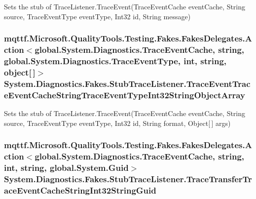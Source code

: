 Sets the stub of Trace\-Listener.\-Trace\-Event(\-Trace\-Event\-Cache event\-Cache, String source, Trace\-Event\-Type event\-Type, Int32 id, String message)

\hypertarget{class_system_1_1_diagnostics_1_1_fakes_1_1_stub_trace_listener_a326c8e6d891c2d7f46301b4ae4d710f0}{
\subsubsection[{Trace\-Event\-Trace\-Event\-Cache\-String\-Trace\-Event\-Type\-Int32\-String\-Object\-Array}]{\setlength{\rightskip}{0pt plus 5cm}mqttf.\-Microsoft.\-Quality\-Tools.\-Testing.\-Fakes.\-Fakes\-Delegates.\-Action$<$global.\-System.\-Diagnostics.\-Trace\-Event\-Cache, string, global.\-System.\-Diagnostics.\-Trace\-Event\-Type, int, string, object\mbox{[}$\,$\mbox{]}$>$ System.\-Diagnostics.\-Fakes.\-Stub\-Trace\-Listener.\-Trace\-Event\-Trace\-Event\-Cache\-String\-Trace\-Event\-Type\-Int32\-String\-Object\-Array}}\label{class_system_1_1_diagnostics_1_1_fakes_1_1_stub_trace_listener_a326c8e6d891c2d7f46301b4ae4d710f0}


Sets the stub of Trace\-Listener.\-Trace\-Event(\-Trace\-Event\-Cache event\-Cache, String source, Trace\-Event\-Type event\-Type, Int32 id, String format, Object\mbox{[}$\,$\mbox{]} args)

\hypertarget{class_system_1_1_diagnostics_1_1_fakes_1_1_stub_trace_listener_a0b27af26453f9da65554bda65357d899}{
\subsubsection[{Trace\-Transfer\-Trace\-Event\-Cache\-String\-Int32\-String\-Guid}]{\setlength{\rightskip}{0pt plus 5cm}mqttf.\-Microsoft.\-Quality\-Tools.\-Testing.\-Fakes.\-Fakes\-Delegates.\-Action$<$global.\-System.\-Diagnostics.\-Trace\-Event\-Cache, string, int, string, global.\-System.\-Guid$>$ System.\-Diagnostics.\-Fakes.\-Stub\-Trace\-Listener.\-Trace\-Transfer\-Trace\-Event\-Cache\-String\-Int32\-String\-Guid}}\label{class_system_1_1_diagnostics_1_1_fakes_1_1_stub_trace_listener_a0b27af26453f9da65554bda65357d899}


